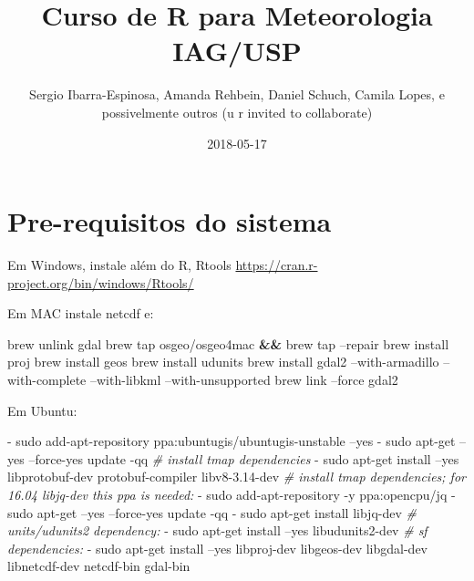 \documentclass[]{book}
\title{Curso de R para Meteorologia IAG/USP}
\author{Sergio Ibarra-Espinosa, Amanda Rehbein, Daniel Schuch, Camila Lopes, e
possivelmente outros (u r invited to collaborate)}
\date{2018-05-17}
\newenvironment{Shaded}{\begin{snugshade}}{\end{snugshade}}
\newcommand{\KeywordTok}[1]{\textcolor[rgb]{0.13,0.29,0.53}{\textbf{#1}}}
\newcommand{\CommentTok}[1]{\textcolor[rgb]{0.56,0.35,0.01}{\textit{#1}}}
\newcommand{\ExtensionTok}[1]{#1}
\newcommand{\NormalTok}[1]{#1}
\begin{document}
\maketitle

{
\setcounter{tocdepth}{1}
\tableofcontents
}
\chapter{Pre-requisitos do sistema}\label{primero}

Em Windows, instale além do R, Rtools
\url{https://cran.r-project.org/bin/windows/Rtools/}

Em MAC instale netcdf e:

\begin{Shaded}
\begin{Highlighting}[]
\ExtensionTok{brew}\NormalTok{ unlink gdal}
\ExtensionTok{brew}\NormalTok{ tap osgeo/osgeo4mac }\KeywordTok{&&} \ExtensionTok{brew}\NormalTok{ tap --repair}
\ExtensionTok{brew}\NormalTok{ install proj}
\ExtensionTok{brew}\NormalTok{ install geos}
\ExtensionTok{brew}\NormalTok{ install udunits}
\ExtensionTok{brew}\NormalTok{ install gdal2 --with-armadillo --with-complete --with-libkml --with-unsupported}
\ExtensionTok{brew}\NormalTok{ link --force gdal2}
\end{Highlighting}
\end{Shaded}

Em Ubuntu:

\begin{Shaded}
\begin{Highlighting}[]
  \ExtensionTok{-}\NormalTok{ sudo add-apt-repository ppa:ubuntugis/ubuntugis-unstable --yes}
  \ExtensionTok{-}\NormalTok{ sudo apt-get --yes --force-yes update -qq}
  \CommentTok{# install tmap dependencies}
  \ExtensionTok{-}\NormalTok{ sudo apt-get install --yes libprotobuf-dev protobuf-compiler libv8-3.14-dev}
  \CommentTok{# install tmap dependencies; for 16.04 libjq-dev this ppa is needed:}
  \ExtensionTok{-}\NormalTok{ sudo add-apt-repository -y ppa:opencpu/jq}
  \ExtensionTok{-}\NormalTok{ sudo apt-get --yes --force-yes update -qq}
  \ExtensionTok{-}\NormalTok{ sudo apt-get install libjq-dev}
  \CommentTok{# units/udunits2 dependency:}
  \ExtensionTok{-}\NormalTok{ sudo apt-get install --yes libudunits2-dev}
  \CommentTok{# sf dependencies:}
  \ExtensionTok{-}\NormalTok{ sudo apt-get install --yes libproj-dev libgeos-dev libgdal-dev libnetcdf-dev  netcdf-bin gdal-bin}
\end{Highlighting}
\end{Shaded}
\end{document}
